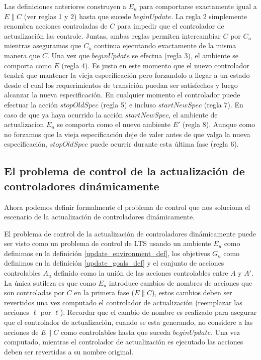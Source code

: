 Las definiciones anteriores construyen a $E_u$ para comportarse exactamente igual a $E\|C$ (ver reglas 1 y 2) hasta que
sucede $beginUpdate$. La regla 2 simplemente renombra acciones controladas de $C$ para impedir que el controlador de
actualización las controle. Juntas, ambas reglas permiten intercambiar $C$ por $C_u$ mientras aseguramos que $C_u$
continua ejecutando exactamente de la misma manera que $C$. Una vez que $beginUpdate$ se efectua (regla 3), el ambiente
se comporta como $E$ (regla 4). Es justo en este momento que el nuevo controlador tendrá que mantener la vieja
especificación pero forzandolo a llegar a un estado desde el cual los requerimientos de transición puedan ser
satisfechos y luego alcanzar la nueva especificación. En cualquier momento el controlador puede efectuar la acción
$stopOldSpec$ (regla 5) e incluso $startNewSpec$ (regla 7). En caso de que ya haya ocurrido la acción $startNewSpec$, el
ambiente de actualizacion $E_u$ se comporta como el nuevo ambiente $E'$ (regla 8). Aunque como no forzamos que la
vieja especificación deje de valer antes de que valga la nueva especificación, $stopOldSpec$ puede ocurrir durante esta
última fase (regla 6).

\subsection{El problema de control de la actualización de controladores dinámicamente}

Ahora podemos definir formalmente el problema de control que nos soluciona el escenario de la actualización de
controladores dinámicamente.

El problema de control de la actualización de controladores dinámicamente puede ser visto como un problema de control de
LTS usando un ambiente $E_u$ como definimos en la definición \ref{update_environment_def}, los objetivos $G_u$ como
definimos en la definición \ref{update_goals_def} y el conjunto de acciones controlables $A_u$ definido como la unión de las
acciones controlables entre $A$ y $A'$. La única sutileza es que como $E_u$ introduce cambios de nombres de acciones que
son controladas por $C$ en la primera fase ($E\|C$), estos cambios deben ser revertidos una vez computado el controlador
de actualización (reemplazar las acciones $\bar{\ell}$ por $\ell$). Recordar que el cambio de nombre es realizado para
asegurar que el controlador de actualización, cuando se esta generando, no considere a las acciones de $E\|C$ como
controlables hasta que suceda $beginUpdate$. Una vez computado, mientras el controlador de actualización es ejecutado
las acciones deben ser revertidas a su nombre original.

